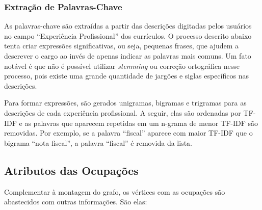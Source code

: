 \documentclass[12pt,a4paper]{article}
\begin{document}
\subsubsection{Extração de Palavras-Chave}

As palavras-chave são extraídas a partir das descrições digitadas pelos usuários no campo \enquote{Experiência Profissional} dos currículos. O processo descrito abaixo tenta criar expressões significativas, ou seja, pequenas frases, que ajudem a descrever o cargo ao invés de apenas indicar as palavras mais comuns. Um fato notável é que não é possível utilizar \textit{stemming} ou correção ortográfica nesse processo, pois existe uma grande quantidade de jargões e siglas específicos nas descrições.

Para formar expressões, são gerados unigramas, bigramas e trigramas para as descrições de cada experiência profissional. A seguir, elas são ordenadas por TF-IDF e as palavras que aparecem repetidas em um n-grama de menor TF-IDF são removidas. Por exemplo, se a palavra \enquote{fiscal} aparece com maior TF-IDF que o bigrama \enquote{nota fiscal}, a palavra \enquote{fiscal} é removida da lista.

\subsection{Atributos das Ocupações}

Complementar à montagem do grafo, os vértices com as ocupações são abastecidos com outras informações. São elas:
\end{document}
